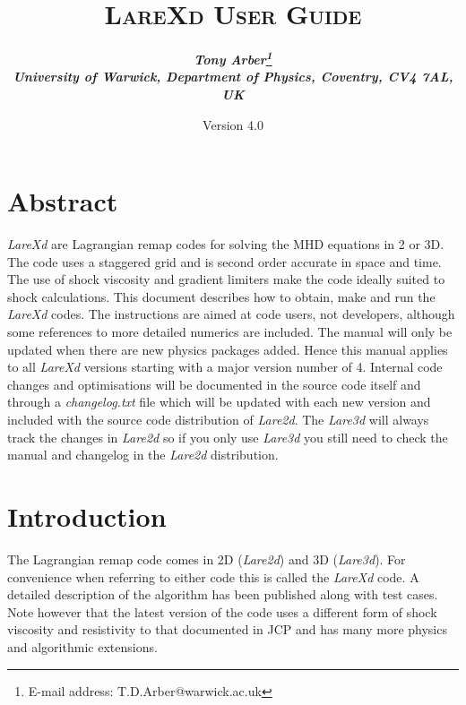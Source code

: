 \documentclass[11pt]{article}
\begin{document}
\title{
\bfseries\scshape LareXd User Guide}
\author{\bfseries\itshape Tony Arber\thanks{E-mail address: T.D.Arber@warwick.ac.uk}\\
University of Warwick, Department of Physics, Coventry, CV4 7AL, UK}
\date{Version 4.0}
\maketitle

\thispagestyle{empty}

\section*{Abstract}
{\it LareXd} are Lagrangian remap codes for solving the MHD equations in 2 or 3D. The code uses a staggered grid 
and is second order accurate in space and time. The use of shock viscosity and gradient limiters make the code 
ideally suited to shock calculations. This document describes how to obtain, make and run the {\it LareXd}  
codes. The instructions are aimed at code users, not developers, although some references to more detailed 
numerics are included. The manual will only be
updated when there are new physics packages added. Hence this manual applies to all {\it LareXd} versions 
starting with a major version number of 4. Internal code changes and optimisations will be documented in the 
source code itself and through a {\it changelog.txt} file which will be updated with each new version and 
included with the source code distribution of {\it Lare2d}. The {\it Lare3d} will always track the changes 
in {\it Lare2d} so if you only use {\it Lare3d} you still need to check the manual and changelog in the 
{\it Lare2d} distribution.


\section{Introduction}
The Lagrangian remap code comes in 2D ({\it Lare2d}) and 3D ({\it Lare3d}). For convenience when referring 
to either code this is called the {\it LareXd} code. A detailed description of the algorithm has been 
published \cite{jcp} along with test cases. Note however that the latest version of the code uses a 
different form of shock viscosity and resistivity to that documented in JCP and has many more physics and algorithmic extensions.
\end{document}
